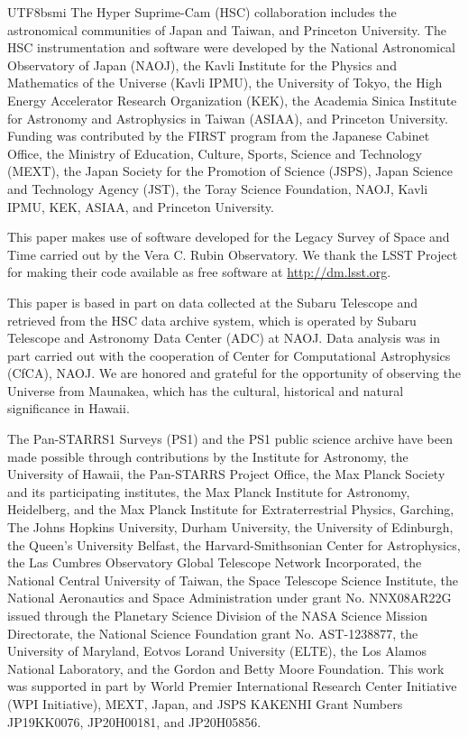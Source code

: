 \documentclass[longauth]{aa}
\begin{document}
\begin{CJK*}{UTF8}{bsmi}
The Hyper Suprime-Cam (HSC) collaboration includes the astronomical communities of Japan and Taiwan, and Princeton University.  The HSC instrumentation and software were developed by the National Astronomical Observatory of Japan (NAOJ), the Kavli Institute for the Physics and Mathematics of the Universe (Kavli IPMU), the University of Tokyo, the High Energy Accelerator Research Organization (KEK), the Academia Sinica Institute for Astronomy and Astrophysics in Taiwan (ASIAA), and Princeton University.  Funding was contributed by the FIRST program from the Japanese Cabinet Office, the Ministry of Education, Culture, Sports, Science and Technology (MEXT), the Japan Society for the Promotion of Science (JSPS), Japan Science and Technology Agency  (JST), the Toray Science  Foundation, NAOJ, Kavli IPMU, KEK, ASIAA, and Princeton University.

This paper makes use of software developed for the Legacy Survey of Space and Time carried out by the Vera C. Rubin Observatory. We thank the LSST Project for making their code available as free software at \url{http://dm.lsst.org}.

This paper is based in part on data collected at the Subaru Telescope and retrieved from the HSC data archive system, which is operated by Subaru Telescope and Astronomy Data Center (ADC) at NAOJ. Data analysis was in part carried out with the cooperation of Center for Computational Astrophysics (CfCA), NAOJ.
We are honored and grateful for the opportunity of observing the Universe from Maunakea, which has the cultural, historical and natural significance in Hawaii.

The Pan-STARRS1 Surveys (PS1) and the PS1 public science archive have been made possible through contributions by the Institute for Astronomy, the University of Hawaii, the Pan-STARRS Project Office, the Max Planck Society and its participating institutes, the Max Planck Institute for Astronomy, Heidelberg, and the Max Planck Institute for Extraterrestrial Physics, Garching, The Johns Hopkins University, Durham University, the University of Edinburgh, the Queen's University Belfast, the Harvard-Smithsonian Center for Astrophysics, the Las Cumbres Observatory Global Telescope Network Incorporated, the National Central University of Taiwan, the Space Telescope Science Institute, the National Aeronautics and Space Administration under grant No. NNX08AR22G issued through the Planetary Science Division of the NASA Science Mission Directorate, the National Science Foundation grant No. AST-1238877, the University of Maryland, Eotvos Lorand University (ELTE), the Los Alamos National Laboratory, and the Gordon and Betty Moore Foundation.
This work was supported in part by World Premier International Research Center Initiative (WPI Initiative), MEXT, Japan, and JSPS KAKENHI Grant Numbers JP19KK0076, JP20H00181, and JP20H05856.


\end{CJK*}
\end{document}
